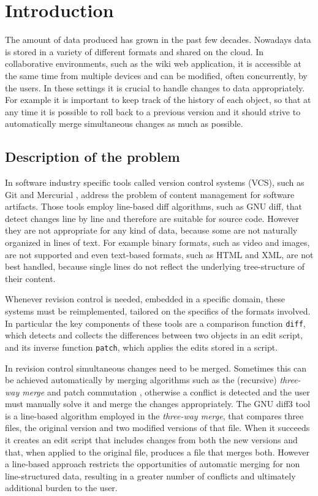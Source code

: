 \documentclass[../Thesis.tex]{subfiles}
\begin{document}
\chapter{Introduction}

The amount of data produced has grown in the past few decades.
Nowadays data is stored in a variety of different formats and shared on the cloud.
In collaborative environments, such as the wiki web application, it is accessible at the same time from multiple devices and can be modified, often concurrently, by the users.
In these settings it is crucial to handle changes to data appropriately.
For example it is important to keep track of the history
of each object, so that at any time it is possible to roll
back to a previous version and it should strive to automatically
merge simultaneous changes as much as possible.

	\section{Description of the problem}
	\label{sec:Problem}
	In software industry specific tools called version control systems (VCS),
	such as Git \cite{GIT} and Mercurial \cite{Mercurial},
	address the problem of content management for software artifacts.
	Those tools employ line-based diff algorithms, such as GNU diff,
	that detect changes line by line and therefore are suitable 
	for source code. 
	However they are not appropriate for any kind of data, 
	because some are not naturally organized in lines of text.
	For example binary formats, such as video and images, are not
	supported and even text-based formats, such as HTML and XML, 	
	are not best handled, because single lines do not reflect 
	the underlying tree-structure of their content.
	
	Whenever revision control is needed, embedded in a specific 
	domain, these systems must be reimplemented, tailored on the specifics of 
	the formats 	involved.
	In particular the key components of these tools are a comparison function
	\texttt{diff}, which detects and collects the differences between two objects 
	in an edit script, and its inverse function \texttt{patch}, which applies 
	the edits stored in a script.	
	
	In revision control simultaneous changes need to be merged.
	Sometimes this can be achieved automatically by merging algorithms 
	such as the (recursive) \emph{three-way merge} and patch commutation 
	\cite{Darcs}, otherwise a 
	conflict is detected and the user must manually solve it and merge the 
	changes appropriately. 
	The GNU diff3 tool is a line-based algorithm employed in the
	\emph{three-way merge}, that compares three files, 
	the original version and two modified versions of that file.
	When it succeeds it creates an edit script that includes changes from 
	both the new versions and that, when applied to the original file, 
	produces a file that merges both.
	However a line-based approach restricts
	the opportunities of automatic merging for non 
	line-structured data, resulting in a greater number of conflicts and 
	ultimately additional burden to the user.
\end{document}
